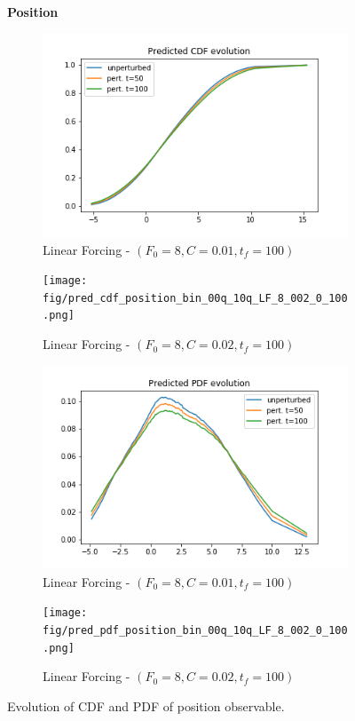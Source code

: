 \documentclass{article}
\begin{document}
\begin{figure}[!ht]
	\centering
	\textbf{Position}\par\medskip
	\begin{subfigure}[b]{0.48\textwidth}
		\includegraphics[width=1\linewidth]{fig/pred_cdf_position_bin_00q_10q_LF_8_001_0_100.png}
		\caption{Linear Forcing - $(F_0=8, C=0.01, t_f=100)$}
		\label{fig:pred_cdf_position_bin_00q_10q_LF_8_001_0_100}
	\end{subfigure}%
	\begin{subfigure}[b]{0.48\textwidth}
		\texttt{[image: fig/pred\_cdf\_position\_bin\_00q\_10q\_LF\_8\_002\_0\_100.png]}
		\caption{Linear Forcing - $(F_0=8, C=0.02, t_f=100)$}
		\label{fig:pred_cdf_position_bin_00q_10q_LF_8_002_0_100}
	\end{subfigure}
	\begin{subfigure}[b]{0.48\textwidth}
		\includegraphics[width=1\linewidth]{fig/pred_pdf_position_bin_00q_10q_LF_8_001_0_100.png}
		\caption{Linear Forcing - $(F_0=8, C=0.01, t_f=100)$}
		\label{fig:pred_pdf_position_bin_00q_10q_LF_8_001_0_100}
	\end{subfigure}%
	\begin{subfigure}[b]{0.48\textwidth}
		\texttt{[image: fig/pred\_pdf\_position\_bin\_00q\_10q\_LF\_8\_002\_0\_100.png]}
		\caption{Linear Forcing - $(F_0=8, C=0.02, t_f=100)$}
		\label{fig:pred_pdf_position_bin_00q_10q_LF_8_002_0_100}
	\end{subfigure}
	\caption{Evolution of CDF and PDF of position observable.}
	\label{fig:pred_position_cdf_pdf}
\end{figure}


\clearpage



\end{document}
